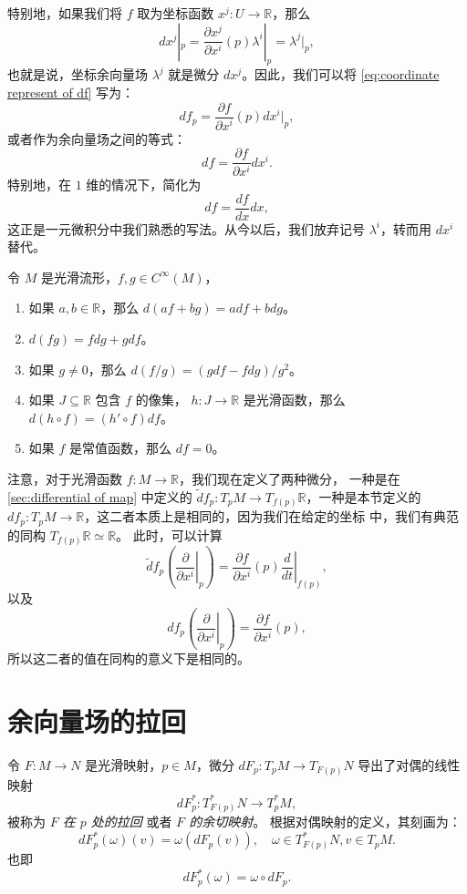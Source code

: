 \documentclass[fontset=none]{Notes}
\begin{document}
特别地，如果我们将 $f$ 取为坐标函数 $x^j:U\to \mathbb{R}$，那么
\[
  dx^j|_p=  \frac{\partial x^j}{\partial x^i}(p)\lambda^i|_p
  =\lambda^j|_p,
\]
也就是说，坐标余向量场 $\lambda^j$ 就是微分 $dx^j$。因此，我们可以将
\eqref{eq:coordinate represent of df} 写为：
\[
  df_p=  \frac{\partial f}{\partial x^i}(p)dx^i|_p,
\]
或者作为余向量场之间的等式：
\begin{equation}
  df=\frac{\partial f}{\partial x^i}dx^i.
\end{equation}
特别地，在 $1$ 维的情况下，简化为
\[
  df=\frac{df}{dx}dx,  
\]
这正是一元微积分中我们熟悉的写法。从今以后，我们放弃记号
$\lambda^i$，转而用 $dx^i$ 替代。

\begin{proposition}[微分的性质]
  令 $M$ 是光滑流形，$f,g\in C^\infty(M)$，
  \begin{enumerate}
    \item 如果 $a,b\in \mathbb{R}$，那么
    $d(af+bg)=adf+bdg$。
    \item $d(fg)=fdg+gdf$。
    \item 如果 $g\neq 0$，那么 $d(f/g)=(gdf-fdg)/g^2$。
    \item 如果 $J\subseteq \mathbb{R}$ 包含 $f$ 的像集，
    $h:J\to \mathbb{R}$ 是光滑函数，那么
    $d(h\circ f)=(h'\circ f)df$。
    \item 如果 $f$ 是常值函数，那么 $df=0$。
  \end{enumerate}
\end{proposition}


注意，对于光滑函数 $f:M\to \mathbb{R}$，我们现在定义了两种微分，
一种是在 \ref{sec:differential of map} 中定义的
$\tilde{d}\!f_p:T_pM\to T_{f(p)}\mathbb{R}$，一种是本节定义的
$df_p:T_pM\to \mathbb{R}$，这二者本质上是相同的，因为我们在给定的坐标
中，我们有典范的同构 $T_{f(p)}\mathbb{R}\simeq \mathbb{R}$。
此时，可以计算
\[
  \tilde d\!f_p\left(\left.\frac{\partial}{\partial x^i}\right|_p\right)
  =\frac{\partial f}{\partial x^i}(p)\left.\frac{d}{dt}\right|_{f(p)},
\]
以及
\[
  df_p   \left(\left.\frac{\partial}{\partial x^i}\right|_p\right)
  =\frac{\partial f}{\partial x^i}(p),
\]
所以这二者的值在同构的意义下是相同的。

\section{余向量场的拉回}

令 $F:M\to N$ 是光滑映射，$p\in M$，微分 $dF_p:T_pM\to T_{F(p)}N$
导出了对偶的线性映射
\[
  dF_p^*:T_{F(p)}^*N\to T_p^*M,  
\]
被称为 \emph{$F$ 在 $p$ 处的拉回} 或者 \emph{$F$ 的余切映射}。
根据对偶映射的定义，其刻画为：
\[
  dF_p^*(\omega)(v)= \omega(dF_p(v)),\quad \omega\in T_{F(p)}^*N,
  v\in T_pM.
\]
也即
\[
  dF_p^*(\omega)=\omega\circ dF_p.  
\]
\end{document}
